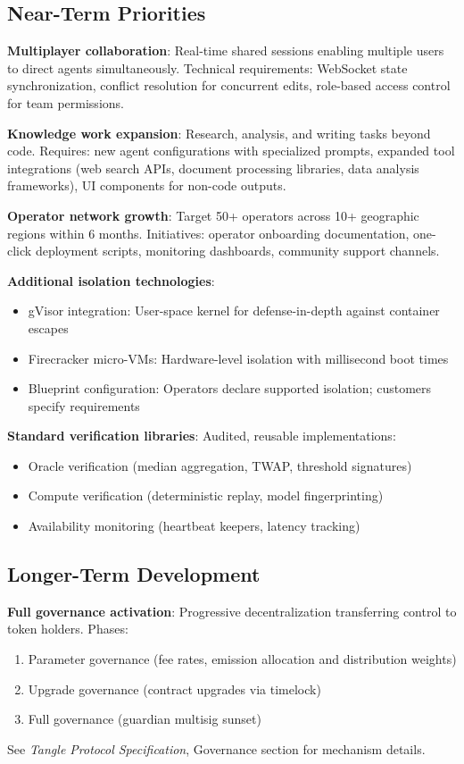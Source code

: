 \documentclass[11pt,a4paper]{article}
\begin{document}
\subsection{Near-Term Priorities}

\textbf{Multiplayer collaboration}: Real-time shared sessions enabling multiple users to direct agents simultaneously. Technical requirements: WebSocket state synchronization, conflict resolution for concurrent edits, role-based access control for team permissions.

\textbf{Knowledge work expansion}: Research, analysis, and writing tasks beyond code. Requires: new agent configurations with specialized prompts, expanded tool integrations (web search APIs, document processing libraries, data analysis frameworks), UI components for non-code outputs.

\textbf{Operator network growth}: Target 50+ operators across 10+ geographic regions within 6 months. Initiatives: operator onboarding documentation, one-click deployment scripts, monitoring dashboards, community support channels.

\textbf{Additional isolation technologies}:
\begin{itemize}[noitemsep]
    \item gVisor integration: User-space kernel for defense-in-depth against container escapes
    \item Firecracker micro-VMs: Hardware-level isolation with millisecond boot times
    \item Blueprint configuration: Operators declare supported isolation; customers specify requirements
\end{itemize}

\textbf{Standard verification libraries}: Audited, reusable implementations:
\begin{itemize}[noitemsep]
    \item Oracle verification (median aggregation, TWAP, threshold signatures)
    \item Compute verification (deterministic replay, model fingerprinting)
    \item Availability monitoring (heartbeat keepers, latency tracking)
\end{itemize}

\subsection{Longer-Term Development}

\textbf{Full governance activation}: Progressive decentralization transferring control to token holders. Phases:
\begin{enumerate}[noitemsep]
    \item Parameter governance (fee rates, emission allocation and distribution weights)
    \item Upgrade governance (contract upgrades via timelock)
    \item Full governance (guardian multisig sunset)
\end{enumerate}
See \textit{Tangle Protocol Specification}, Governance section for mechanism details.
\end{document}
